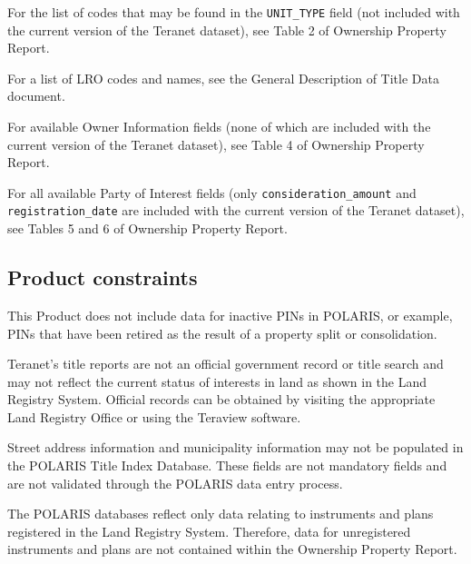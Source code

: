 For the list of codes that may be found in the \texttt{UNIT\_TYPE} field (not included with the current version of the Teranet dataset), see Table 2 of Ownership Property Report\cite{TeranetEnterprisesInc.2011}.

\vspace{5mm}

For a list of LRO codes and names, see the General Description of Title Data document.

\vspace{5mm}

For available Owner Information fields (none of which are included with the current version of the Teranet dataset), see Table 4 of Ownership Property Report\cite{TeranetEnterprisesInc.2011}.

\vspace{5mm}

For all available Party of Interest fields (only \texttt{consideration\_amount} and \texttt{registration\_date} are included with the current version of the Teranet dataset), see Tables 5 and 6 of Ownership Property Report\cite{TeranetEnterprisesInc.2011}.

\subsection{Product constraints} \label{subsec:teranet_product_constraints}

This Product does not include data for inactive PINs in POLARIS, or example, PINs that have been retired as the result of a property split or consolidation.

Teranet's title reports are not an official government record or title search and may not reflect the current status of interests in land as shown in the Land Registry System.
Official records can be obtained by visiting the appropriate Land Registry Office or using the Teraview software.

Street address information and municipality information may not be populated in the POLARIS Title Index Database.
These fields are not mandatory fields and are not validated through the POLARIS data entry process.

The POLARIS databases reflect only data relating to instruments and plans registered in the Land Registry System.
Therefore, data for unregistered instruments and plans are not contained within the Ownership Property Report.

